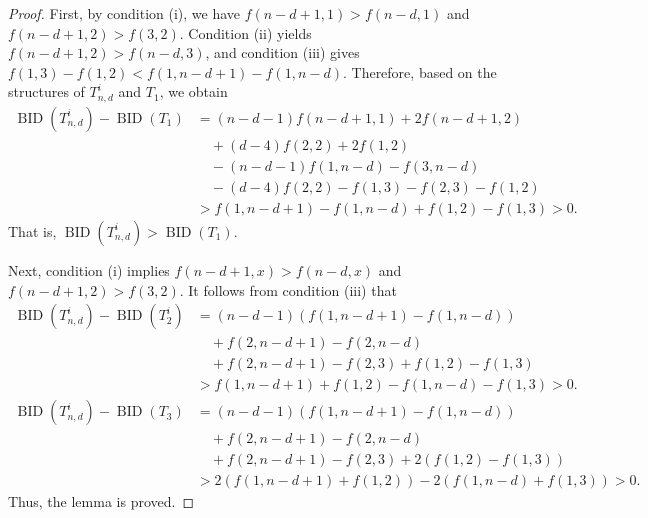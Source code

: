 \documentclass[12pt]{article}
\theoremstyle{definition}
\newcommand{\BID}{\operatorname{BID}}
\begin{document}
\begin{proof}
First, by condition (i), we have \(f(n-d+1,1) > f(n-d,1)\) and \(f(n-d+1,2) > f(3,2)\). Condition (ii) yields \(f(n-d+1,2) > f(n-d,3)\), and condition (iii) gives \(f(1,3) - f(1,2) < f(1,n-d+1) - f(1,n-d)\). Therefore, based on the structures of \(T_{n,d}^i\) and \(T_1\), we obtain
\begin{align*}
\BID(T_{n,d}^i) - \BID(T_1) &= (n-d-1)f(n-d+1,1) + 2f(n-d+1,2) \\
&\quad + (d-4)f(2,2) + 2f(1,2) \\
&\quad - (n-d-1)f(1,n-d) - f(3,n-d) \\
&\quad - (d-4)f(2,2) - f(1,3) - f(2,3) - f(1,2) \\[4pt]
&> f(1,n-d+1) - f(1,n-d) + f(1,2) - f(1,3) > 0.
\end{align*}
That is, \(\BID(T_{n,d}^i) > \BID(T_1)\).

Next, condition (i) implies \(f(n-d+1,x) > f(n-d,x)\) and \(f(n-d+1,2) > f(3,2)\). It follows from condition (iii) that
\begin{align*}
\BID(T_{n,d}^i) - \BID(T_2^i) &= (n-d-1)(f(1,n-d+1) - f(1,n-d)) \\
&\quad + f(2,n-d+1) - f(2,n-d) \\
&\quad + f(2,n-d+1) - f(2,3) + f(1,2) - f(1,3) \\[4pt]
&> f(1,n-d+1) + f(1,2) - f(1,n-d) - f(1,3) > 0.
\end{align*}
\begin{align*}
\BID(T_{n,d}^i) - \BID(T_3) &= (n-d-1)(f(1,n-d+1) - f(1,n-d)) \\
&\quad + f(2,n-d+1) - f(2,n-d) \\
&\quad + f(2,n-d+1) - f(2,3) + 2(f(1,2) - f(1,3)) \\[4pt]
&> 2(f(1,n-d+1) + f(1,2)) - 2(f(1,n-d) + f(1,3)) > 0.
\end{align*}
Thus, the lemma is proved.
\end{proof}
\end{document}
